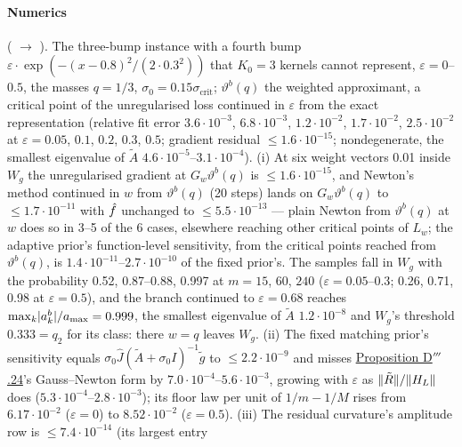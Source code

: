 \paragraph{Numerics} ( $\to$ ). The three-bump instance
with a fourth bump $\varepsilon\cdot\exp(-(x - 0.8)^2/(2\cdot0.3^2))$ that $K_0 = 3$ kernels cannot represent,
$\varepsilon = 0$--$0.5$, the masses $q = 1/3$, $\sigma_0 = 0.15\sigma_{\mathrm{crit}}$; $\vartheta^b(q)$ the weighted
approximant, a critical point of the unregularised loss continued in $\varepsilon$ from the exact representation
(relative fit error $3.6\cdot10^{-3}$, $6.8\cdot10^{-3}$, $1.2\cdot10^{-2}$, $1.7\cdot10^{-2}$, $2.5\cdot10^{-2}$ at
$\varepsilon = 0.05$, $0.1$, $0.2$, $0.3$, $0.5$; gradient residual $\le1.6\cdot10^{-15}$; nondegenerate, the
smallest eigenvalue of $\tilde A$ $4.6\cdot10^{-5}$--$3.1\cdot10^{-4}$). (i) At six weight vectors 0.01 inside $W_g$
the unregularised gradient at $G_w\vartheta^b(q)$ is $\le1.6\cdot10^{-15}$, and Newton's method continued in $w$ from
$\vartheta^b(q)$ (20 steps) lands on $G_w\vartheta^b(q)$ to $\le1.7\cdot10^{-11}$ with $\hat f$ unchanged to
$\le5.5\cdot10^{-13}$ --- plain Newton from $\vartheta^b(q)$ at $w$ does so in 3--5 of the 6 cases, elsewhere
reaching other critical points of $L_w$; the adaptive prior's function-level sensitivity, from the critical points
reached from $\vartheta^b(q)$, is $1.4\cdot10^{-11}$--$2.7\cdot10^{-10}$ of the fixed prior's. The samples fall in
$W_g$ with the probability 0.52, 0.87--0.88, 0.997 at $m = 15$, $60$, $240$ ($\varepsilon = 0.05$--$0.3$; 0.26, 0.71,
0.98 at $\varepsilon = 0.5$), and the branch continued to $\varepsilon = 0.68$ reaches
$\max_k\lvert a^b_k\rvert/a_{\max} = 0.999$, the smallest eigenvalue of $\tilde A$ $1.2\cdot10^{-8}$ and $W_g$'s threshold
$0.333 = q_2$ for its class: there $w = q$ leaves $W_g$. (ii) The fixed matching prior's sensitivity equals
$\sigma_0\hat J(\tilde A + \sigma_0I)^{-1}\tilde g$ to $\le2.2\cdot10^{-9}$ and misses
\hyperref[res:thmDppp:24]{Proposition D$'''$.24}'s Gauss--Newton form by $7.0\cdot10^{-4}$--$5.6\cdot10^{-3}$,
growing with $\varepsilon$ as $\lVert \tilde R\rVert/\lVert H_L\rVert$ does ($5.3\cdot10^{-4}$--$2.8\cdot10^{-3}$); its floor law
per unit of $1/m - 1/M$ rises from $6.17\cdot10^{-2}$ ($\varepsilon = 0$) to $8.52\cdot10^{-2}$
($\varepsilon = 0.5$). (iii) The residual curvature's amplitude row is $\le7.4\cdot10^{-14}$ (its largest entry
